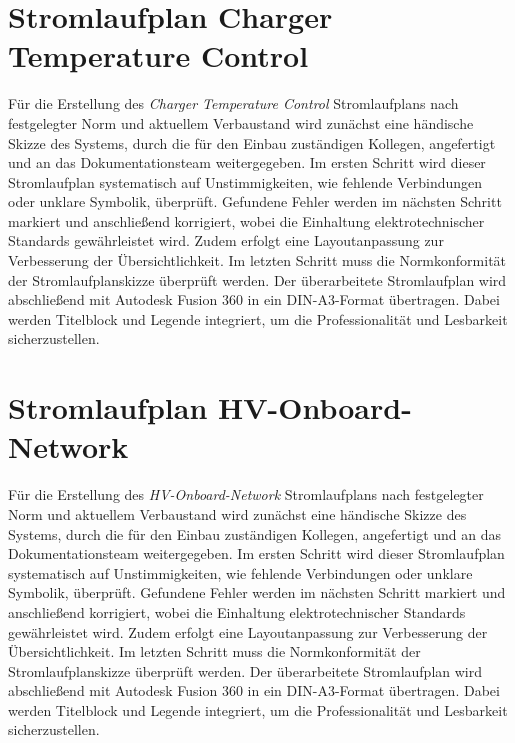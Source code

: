 \section*{Stromlaufplan Charger Temperature Control}
Für die Erstellung des \textit{Charger Temperature Control} Stromlaufplans nach festgelegter Norm und aktuellem Verbaustand wird zunächst eine händische Skizze des Systems, durch die für den Einbau zuständigen Kollegen, angefertigt und an das Dokumentationsteam weitergegeben. Im ersten Schritt wird dieser Stromlaufplan systematisch auf Unstimmigkeiten, wie fehlende Verbindungen oder unklare Symbolik, überprüft. Gefundene Fehler werden im nächsten Schritt markiert und anschließend korrigiert, wobei die Einhaltung elektrotechnischer Standards gewährleistet wird. Zudem erfolgt eine Layoutanpassung zur Verbesserung der Übersichtlichkeit. Im letzten Schritt muss die Normkonformität der Stromlaufplanskizze überprüft werden. Der überarbeitete Stromlaufplan wird abschließend mit Autodesk Fusion 360 in ein DIN-A3-Format übertragen. Dabei werden Titelblock und Legende integriert, um die Professionalität und Lesbarkeit sicherzustellen.


\addtocounter{page}{1} %

\section*{Stromlaufplan HV-Onboard-Network}
Für die Erstellung des \textit{HV-Onboard-Network} Stromlaufplans nach festgelegter Norm und aktuellem Verbaustand wird zunächst eine händische Skizze des Systems, durch die für den Einbau zuständigen Kollegen, angefertigt und an das Dokumentationsteam weitergegeben. Im ersten Schritt wird dieser Stromlaufplan systematisch auf Unstimmigkeiten, wie fehlende Verbindungen oder unklare Symbolik, überprüft. Gefundene Fehler werden im nächsten Schritt markiert und anschließend korrigiert, wobei die Einhaltung elektrotechnischer Standards gewährleistet wird. Zudem erfolgt eine Layoutanpassung zur Verbesserung der Übersichtlichkeit. Im letzten Schritt muss die Normkonformität der Stromlaufplanskizze überprüft werden. Der überarbeitete Stromlaufplan wird abschließend mit Autodesk Fusion 360 in ein DIN-A3-Format übertragen. Dabei werden Titelblock und Legende integriert, um die Professionalität und Lesbarkeit sicherzustellen.

